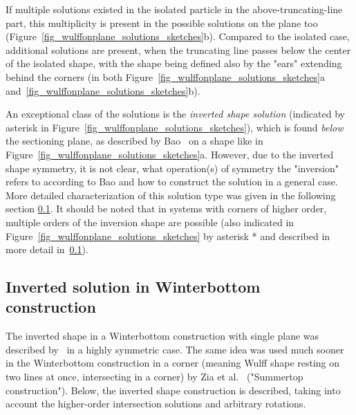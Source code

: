 	If multiple solutions existed in the isolated particle in the above-truncating-line part, this multiplicity is present in the possible solutions on the plane too (Figure~\ref{fig_wulffonplane_solutions_sketches}b). Compared to the isolated case, additional solutions are present, when the truncating line passes below the center of the isolated shape, with the shape being defined also by the "ears" extending behind the corners (in both Figure~\ref{fig_wulffonplane_solutions_sketches}a and~\ref{fig_wulffonplane_solutions_sketches}b).
	
	An exceptional class of the solutions is the \textit{inverted shape solution} (indicated by asterisk in Figure~\ref{fig_wulffonplane_solutions_sketches}), which is found \textit{below} the sectioning plane, as described by Bao~\cite{Bao2017} on a shape like in Figure~\ref{fig_wulffonplane_solutions_sketches}a. However, due to the inverted shape symmetry, it is not clear, what operation(s) of symmetry the "inversion" refers to according to Bao and how to construct the solution in a general case. More detailed characterization of this solution type was given in the following section \ref{sec_inverted_Winterbottom}. It should be noted that in systems with corners of higher order, multiple orders of the inversion shape are possible (also indicated in Figure~\ref{fig_wulffonplane_solutions_sketches} by asterisk * and described in more detail in~\ref{sec_inverted_Winterbottom}).
	
	\subsection{Inverted solution in Winterbottom construction} \label{sec_inverted_Winterbottom}
	The inverted shape in a Winterbottom construction with single plane was described by~\cite{Bao2017} in a highly symmetric case. The same idea was used much sooner in the Winterbottom construction in a corner (meaning Wulff shape resting on two lines at once, intersecting in a corner) by Zia et al.~\cite{Zia1988} ("Summertop construction"). Below, the inverted shape construction is described, taking into account the higher-order intersection solutions and arbitrary rotations.
	

